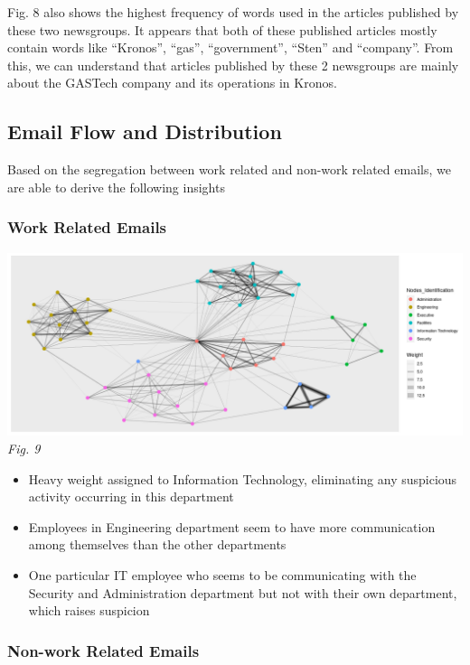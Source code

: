 \documentclass{acm_proc_article-sp}
\providecommand{\tightlist}{%
  \setlength{\itemsep}{0pt}\setlength{\parskip}{0pt}}
\begin{document}
Fig. 8 also shows the highest frequency of words used in the articles
published by these two newsgroups. It appears that both of these
published articles mostly contain words like ``Kronos'', ``gas'',
``government'', ``Sten'' and ``company''. From this, we can understand
that articles published by these 2 newsgroups are mainly about the
GASTech company and its operations in Kronos.

\hypertarget{email-flow-and-distribution}{%
\subsection{Email Flow and
Distribution}\label{email-flow-and-distribution}}

Based on the segregation between work related and non-work related
emails, we are able to derive the following insights

\hypertarget{work-related-emails}{%
\subsubsection{Work Related Emails}\label{work-related-emails}}

\includegraphics{img/image14.png} \emph{Fig. 9}

\begin{itemize}
\tightlist
\item
  Heavy weight assigned to Information Technology, eliminating any
  suspicious activity occurring in this department
\item
  Employees in Engineering department seem to have more communication
  among themselves than the other departments
\item
  One particular IT employee who seems to be communicating with the
  Security and Administration department but not with their own
  department, which raises suspicion
\end{itemize}

\hypertarget{non-work-related-emails}{%
\subsubsection{Non-work Related Emails}\label{non-work-related-emails}}
\end{document}
